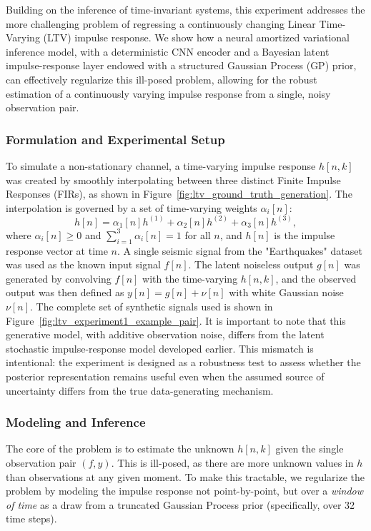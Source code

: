 \documentclass[preprint,1p,times,authoryear]{elsarticle}
\begin{document}
Building on the inference of time-invariant systems, this experiment addresses the more challenging problem of regressing a continuously changing Linear Time-Varying (LTV) impulse response. We show how a neural amortized variational inference model, with a deterministic CNN encoder and a Bayesian latent impulse-response layer endowed with a structured Gaussian Process (GP) prior, can effectively regularize this ill-posed problem, allowing for the robust estimation of a continuously varying impulse response from a single, noisy observation pair.

\subsubsection{Formulation and Experimental Setup}

To simulate a non-stationary channel, a time-varying impulse response $h[n,k]$ was created by smoothly interpolating between three distinct Finite Impulse Responses (FIRs), as shown in Figure~\ref{fig:ltv_ground_truth_generation}. The interpolation is governed by a set of time-varying weights $\alpha_i[n]$:
\begin{equation}
h[n] = \alpha_1[n] h^{(1)} + \alpha_2[n] h^{(2)} + \alpha_3[n] h^{(3)},
\end{equation}
where $\alpha_i[n] \ge 0$ and $\sum_{i=1}^{3} \alpha_i[n] = 1$ for all $n$, and $h[n]$ is the impulse response vector at time $n$. A single seismic signal from the "Earthquakes" dataset was used as the known input signal $f[n]$. The latent noiseless output $g[n]$ was generated by convolving $f[n]$ with the time-varying $h[n,k]$, and the observed output was then defined as $y[n] = g[n] + \nu[n]$ with white Gaussian noise $\nu[n]$. The complete set of synthetic signals used is shown in Figure~\ref{fig:ltv_experiment1_example_pair}. It is important to note that this generative model, with additive observation noise, differs from the latent stochastic impulse-response model developed earlier. This mismatch is intentional: the experiment is designed as a robustness test to assess whether the posterior representation remains useful even when the assumed source of uncertainty differs from the true data-generating mechanism.

\subsubsection{Modeling and Inference}

The core of the problem is to estimate the unknown $h[n,k]$ given the single observation pair $(f, y)$. This is ill-posed, as there are more unknown values in $h$ than observations at any given moment. To make this tractable, we regularize the problem by modeling the impulse response not point-by-point, but over a \textit{window of time} as a draw from a truncated Gaussian Process prior (specifically, over 32 time steps).
\end{document}

